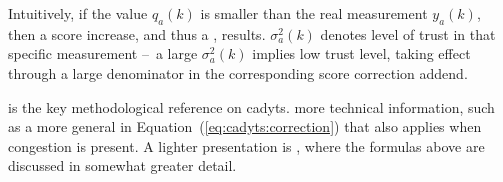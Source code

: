 Intuitively, if the  value $q_a(k)$ is smaller than
the real measurement $y_a(k)$, then a score increase, and thus a , results.
 $\sigma^2_a(k)$ denotes  level of trust in
that specific measurement --\ a large  $\sigma^2_a(k)$ implies
 low trust level, taking effect through a large denominator in the
corresponding score correction addend.

\citet[][]{floetteroed-2010e} is the key methodological reference on \gls{cadyts}.
 more technical information, such as a more general  in
Equation~(\ref{eq:cadyts:correction})\corr{,}{} that also applies when congestion
is present.
A  lighter presentation is 
\citet[][]{FloetteroedChenEtAl2011BehavioralCalibAndAnaNETS}, where the 
formulas above are discussed in somewhat greater detail.


